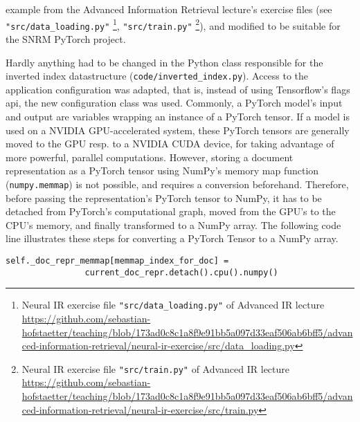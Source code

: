     example from the Advanced Information Retrieval lecture's exercise files
    (see \texttt{"src/data\_loading.py"}
    \footnote{Neural IR exercise file \texttt{"src/data\_loading.py"} of Advanced IR lecture \url{https://github.com/sebastian-hofstaetter/teaching/blob/173ad0c8c1a8f9e91bb5a097d33eaf506ab6bff5/advanced-information-retrieval/neural-ir-exercise/src/data_loading.py}},
    \texttt{"src/train.py"}
    \footnote{Neural IR exercise file \texttt{"src/train.py"} of Advanced IR lecture \url{https://github.com/sebastian-hofstaetter/teaching/blob/173ad0c8c1a8f9e91bb5a097d33eaf506ab6bff5/advanced-information-retrieval/neural-ir-exercise/src/train.py}}),
    and modified to be suitable for the SNRM PyTorch project.

Hardly anything had to be changed in the Python class responsible for the inverted index datastructure 
    (\texttt{code/inverted\_index.py}).
Access to the application configuration was adapted, that is, instead of using Tensorflow's flags api, the 
    new configuration class was used.
Commonly, a PyTorch model's input and output are variables wrapping an instance of a PyTorch tensor.
If a model is used on a NVIDIA GPU-accelerated system, these PyTorch tensors are generally moved to 
    the GPU resp. to a NVIDIA CUDA device, for taking advantage of more powerful, parallel computations.
However, storing a document representation as a PyTorch tensor using NumPy's memory map function 
    (\texttt{numpy.memmap}) is not possible, and requires a conversion beforehand.
Therefore, before passing the representation's PyTorch tensor to NumPy, 
    it has to be detached from PyTorch's computational graph,
    moved from the GPU's to the CPU's memory, and finally transformed to a NumPy array.
The following code line illustrates these steps for converting a PyTorch Tensor to a NumPy array.
\begin{verbatim}
self._doc_repr_memmap[memmap_index_for_doc] = 
                current_doc_repr.detach().cpu().numpy()
\end{verbatim}







    



